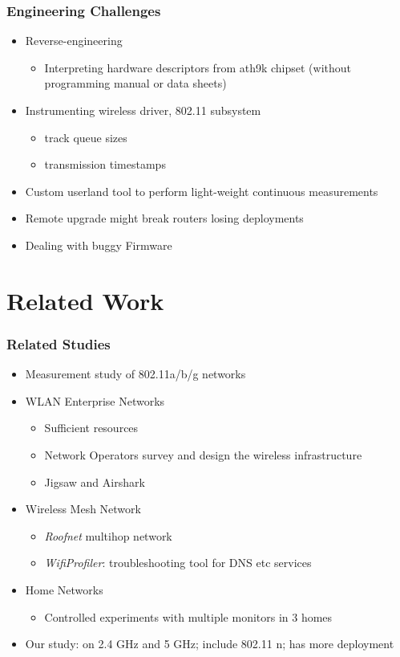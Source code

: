 \documentclass{beamer}
\begin{document}
\begin{frame}
  \frametitle{Engineering Challenges}
    \begin{itemize} 
    \item Reverse-engineering
      \begin{itemize} 
      \item Interpreting hardware descriptors from ath9k chipset (without programming manual or data sheets)
      \end{itemize}
    \item Instrumenting wireless driver, 802.11 subsystem
      \begin{itemize} 
      \item track queue sizes
      \item transmission timestamps
      \end{itemize}
    \item Custom userland tool to perform light-weight continuous measurements
    \item Remote upgrade might break routers losing deployments
    \item Dealing with buggy Firmware
    \end{itemize}
\end{frame}


\section{Related Work}
\begin{frame}
  \frametitle{Related Studies} 
    \begin{itemize}
    \item Measurement study of 802.11a/b/g networks
    \item WLAN Enterprise Networks
      \begin{itemize}
      \item Sufficient resources
      \item Network Operators survey and design the wireless infrastructure
      \item Jigsaw and Airshark 
      \end{itemize}
    \item Wireless Mesh Network
      \begin{itemize}
      \item \textit{Roofnet} multihop network
      \item \textit{WifiProfiler}: troubleshooting tool for DNS etc services
      \end{itemize}
    \item Home Networks
      \begin{itemize}
      \item  Controlled experiments with multiple monitors in 3 homes
      \end{itemize}
    \item Our study: on 2.4 GHz and 5 GHz; include 802.11 n; has more deployment 
    \end{itemize}
\end{frame}
\end{document}
